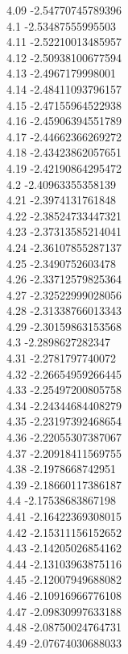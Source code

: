 {4.09	-2.54770745789396\\
4.1	-2.53487555995503\\
4.11	-2.52210013485957\\
4.12	-2.50938100677594\\
4.13	-2.4967179998001\\
4.14	-2.48411093796157\\
4.15	-2.47155964522938\\
4.16	-2.45906394551789\\
4.17	-2.44662366269272\\
4.18	-2.43423862057651\\
4.19	-2.42190864295472\\
4.2	-2.40963355358139\\
4.21	-2.3974131761848\\
4.22	-2.38524733447321\\
4.23	-2.37313585214041\\
4.24	-2.36107855287137\\
4.25	-2.3490752603478\\
4.26	-2.33712579825364\\
4.27	-2.32522999028056\\
4.28	-2.31338766013343\\
4.29	-2.30159863153568\\
4.3	-2.2898627282347\\
4.31	-2.2781797740072\\
4.32	-2.26654959266445\\
4.33	-2.25497200805758\\
4.34	-2.24344684408279\\
4.35	-2.23197392468654\\
4.36	-2.22055307387067\\
4.37	-2.20918411569755\\
4.38	-2.1978668742951\\
4.39	-2.18660117386187\\
4.4	-2.17538683867198\\
4.41	-2.16422369308015\\
4.42	-2.15311156152652\\
4.43	-2.14205026854162\\
4.44	-2.13103963875116\\
4.45	-2.12007949688082\\
4.46	-2.10916966776108\\
4.47	-2.09830997633188\\
4.48	-2.08750024764731\\
4.49	-2.07674030688033\\
}
